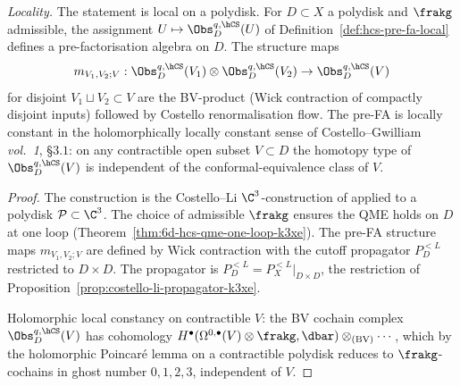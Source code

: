 \begin{proposition}
\label{prop:hcs-pre-fa-local-structure}
\noindent\emph{Locality.} The statement is local on a polydisk.
For $D \subset X$ a polydisk and $\frakg$ admissible, the assignment
$U \mapsto \Obs^{q,\hCS}_D(U)$ of Definition~\ref{def:hcs-pre-fa-local}
defines a pre-factorisation algebra on $D$. The structure maps
\[
 m_{V_1, V_2; V}: \Obs^{q,\hCS}_D(V_1) \otimes \Obs^{q,\hCS}_D(V_2) \to \Obs^{q,\hCS}_D(V)
\]
for disjoint $V_1 \sqcup V_2 \subset V$ are the BV-product (Wick contraction
of compactly disjoint inputs) followed by Costello renormalisation flow.
The pre-FA is locally constant in the holomorphically locally constant
sense of Costello--Gwilliam~\cite{CostelloGwilliam} \emph{vol.~1}, \S$3.1$:
on any contractible open subset $V \subset D$ the homotopy type of
$\Obs^{q,\hCS}_D(V)$ is independent of the conformal-equivalence class of $V$.
\end{proposition}

\begin{proof}
The construction is the Costello--Li $\C^3$-construction of
\cite{CostelloLi2012} applied to a polydisk
$\mathcal{P} \subset \C^3$. The choice of admissible $\frakg$ ensures
the QME holds on $D$ at one loop (Theorem~\ref{thm:6d-hcs-qme-one-loop-k3xe}).
The pre-FA structure maps $m_{V_1, V_2; V}$ are
defined by Wick contraction with the cutoff propagator $P_D^{<L}$
restricted to $D \times D$. The propagator is
$P_D^{<L} = P_X^{<L} \big|_{D \times D}$, the restriction of
Proposition~\ref{prop:costello-li-propagator-k3xe}.

Holomorphic local constancy on contractible $V$: the BV cochain complex
$\Obs^{q,\hCS}_D(V)$ has cohomology
$H^\bullet(\Omega^{0, \bullet}(V) \otimes \frakg, \dbar)
 \otimes_{\mathrm{(BV)}} \cdots$, which by the holomorphic Poincar\'e
lemma on a contractible polydisk reduces to $\frakg$-cochains in
ghost number $0, 1, 2, 3$, independent of $V$.
\end{proof}

